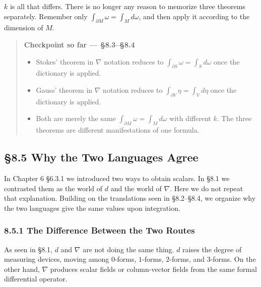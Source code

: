 \documentclass[a4paper,12pt,openany]{book}
\begin{document}
\(k\) is all that differs. There is no longer any reason to memorize
three theorems separately. Remember only
\(\int_{\partial M}\omega = \int_M d\omega\), and then apply it
according to the dimension of \(M\).

\begin{quote}
\textbf{Checkpoint so far — §8.3–§8.4}

\begin{itemize}
\item
  Stokes' theorem in \(\nabla\) notation reduces to
  \(\int_{\partial S}\omega = \int_S d\omega\) once the dictionary is
  applied.
\item
  Gauss' theorem in \(\nabla\) notation reduces to
  \(\int_{\partial V}\eta = \int_V d\eta\) once the dictionary is
  applied.
\item
  Both are merely the same \(\int_{\partial M}\omega = \int_M d\omega\)
  with different \(k\). The three theorems are different manifestations
  of one formula.
\end{itemize}
\end{quote}

\par\vspace{0.35em}\par

\hypertarget{why-the-two-languages-agree}{%
\subsection{§8.5 Why the Two Languages
Agree}\label{why-the-two-languages-agree}}

In Chapter 6 §6.3.1 we introduced two ways to obtain scalars. In §8.1 we
contrasted them as the world of \(d\) and the world of \(\nabla\). Here
we do not repeat that explanation. Building on the translations seen in
§8.2–§8.4, we organize why the two languages give the same values upon
integration.

\hypertarget{the-difference-between-the-two-routes}{%
\subsubsection{8.5.1 The Difference Between the Two
Routes}\label{the-difference-between-the-two-routes}}

As seen in §8.1, \(d\) and \(\nabla\) are not doing the same thing.
\(d\) raises the degree of measuring devices, moving among \(0\)-forms,
\(1\)-forms, \(2\)-forms, and \(3\)-forms. On the other hand, \(\nabla\)
produces scalar fields or column-vector fields from the same formal
differential operator.
\end{document}
